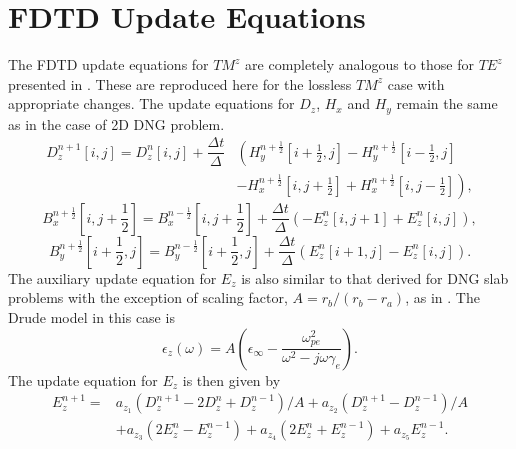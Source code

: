 \section{FDTD Update Equations}
The FDTD update equations for $TM^z$ are completely analogous to those for $TE^z$ presented in \cite{Radial-Zhao}. These are reproduced here for the lossless $TM^z$ case with appropriate changes. The update equations for $D_z$, $H_x$ and $H_y$ remain the same as in the case of 2D DNG problem.
\begin{equation}
\begin{split}
D^{n+1}_z \left[i,j\right]=D^{n}_z \left[i,j\right]+\dfrac{\Delta t}{\Delta}&\left(H^{n+\frac{1}{2}}_y\left[i+\frac{1}{2},j\right]-H^{n+\frac{1}{2}}_y \left[i-\frac{1}{2},j\right]\right.\\
&\left.-H^{n+\frac{1}{2}}_x \left[i,j+\frac{1}{2}\right]+H^{n+\frac{1}{2}}_x \left[i,j-\frac{1}{2}\right]\right),
\end{split}
\label{eq:Dz-2D-FDTD-TMz-Cloak}
\end{equation}
\begin{equation}
B^{n+\frac{1}{2}}_x \left[i,j+\frac{1}{2}\right]=B^{n-\frac{1}{2}}_x \left[i,j+\frac{1}{2}\right] + \dfrac{\Delta t}{\Delta} \left(-E^{n}_z \left[i,j+1\right] + E^{n}_z \left[i,j\right] \right),
\label{eq:Bx-2D-FDTD-TMz-Cloak}
\end{equation}
\begin{equation}
B^{n+\frac{1}{2}}_y \left[i+\frac{1}{2},j\right]=B^{n-\frac{1}{2}}_y \left[i+\frac{1}{2},j\right] + \dfrac{\Delta t}{\Delta} \left( E^{n}_z \left[i+1,j\right] - E^{n}_z \left[i,j\right] \right).
\label{eq:By-2D-FDTD-TMz-Cloak}
\end{equation}
The auxiliary update equation for $E_z$ is also similar to that derived for DNG slab problems with the exception of scaling factor, $A=r_b/(r_b-r_a)$, as in \cite{Radial-Zhao}. The Drude model in this case is
\begin{equation}
\epsilon_z(\omega)=A\left(\epsilon_\infty-\dfrac{\omega_{pe}^2}{\omega^2-j\omega\gamma_e}\right).
\label{eq:Drude-Model-Cloak-Ez}
\end{equation}
The update equation for $E_z$ is then given by
\begin{equation}
\begin{split}
E^{n+1}_z=&a_{z_1}\left(D^{n+1}_z-2D^n_z+D^{n-1}_z\right)/A+a_{z_2}\left(D^{n+1}_z-D^{n-1}_z\right)/A\\
&+a_{z_3}\left(2E^n_z-E^{n-1}_z\right)+a_{z_4}\left(2E^n_z+E^{n-1}_z\right)+a_{z_5}E^{n-1}_z.
\end{split}
\label{eq:Ez-Cloak}
\end{equation}

